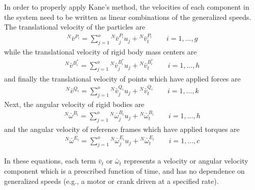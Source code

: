 \documentclass[smallcondensed,final]{svjour3}                     %
\begin{document}
In order to properly apply Kane's method, the velocities of each component in
the system need to be written as linear combinations of the generalized speeds.
The translational velocity of the particles are
\begin{align}
\label{eq:particle_translational}
{^N}\bar{v}^{P_i} = \sum^o_{j=1} {^N}\bar{v}^{P_i}_{j} u_j + {^N}\bar{v}^{P_i}_t
\quad \quad i=1,...,g
\end{align}
while the translational velocity of rigid body mass centers are
\begin{align}
\label{eq:rb_translational}
{^N}\bar{v}^{B_i^*} = \sum_{j=1}^o {^N}\bar{v}^{B_i^*}_{j} u_j +
{^N}\bar{v}^{B_i^*}_t \quad \quad i=1,...,h
\end{align}
and finally the translational velocity of points which have applied forces are
\begin{align}
\label{eq:points_translational}
{^N}\bar{v}^{Q_i} = \sum_{j=1}^o {^N}\bar{v}^{Q_i}_{j} u_j + {^N}\bar{v}^{Q_i}_t
\quad \quad i=1,...,k
\end{align}
Next, the angular velocity of rigid bodies are
\begin{align}
\label{eq:rb_rotational_bodies}
{^N}\bar{\omega}^{B_i} = \sum_{j=1}^o {^N}\bar{\omega}^{B_i}_{j} u_j +
{^N}\bar{\omega}^{B_i}_t \quad \quad i=1,...,h
\end{align}
and the angular velocity of reference frames which have applied torques are
\begin{align}
\label{eq:rb_rotational_frames}
{^N}\bar{\omega}^{E_i} = \sum_{j=1}^o {^N}\bar{\omega}^{E_i}_{j} u_j +
{^N}\bar{\omega}^{E_i}_t \quad \quad i=1,...,c
\end{align}

In these equations, each term $\bar{v}_t$ or $\bar{\omega}_t$ represents a
velocity or angular velocity component which is a prescribed function of time,
and has no dependence on generalized speeds (e.g., a motor or crank driven at a
specified rate).
\end{document}

